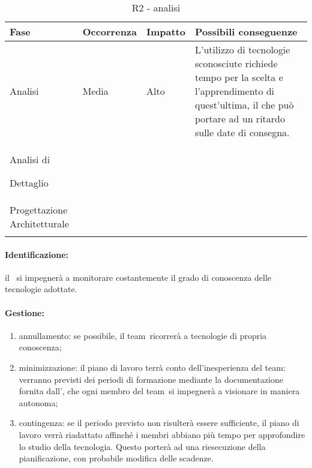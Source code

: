 \documentclass[../PianoProgetto.tex]{subfiles}
\begin{document}
	\begin{table}[h]
		\centering
		\begin{tabularx}{\textwidth}{F O O P}
			\toprule
			\textbf{Fase} & \textbf{Occorrenza} & \textbf{Impatto} & \textbf{Possibili conseguenze}\\
			\midrule
			Analisi & Media & Alto & L'utilizzo di tecnologie sconosciute richiede tempo per la scelta e l'apprendimento di quest'ultima, il che può portare ad un ritardo sulle date di consegna. \\
			\midrule
			Analisi di \par Dettaglio & & & \\
			\midrule
			Progettazione Architetturale & & & \\
			\bottomrule
		\end{tabularx}
		\caption{R2 - analisi}
		\label{tab:R2-analisi}	
	\end{table} 
	
	\paragraph*{Identificazione:} il \responsabilediprogetto\ si impegnerà a monitorare costantemente il grado di conoscenza delle tecnologie adottate.	
	
	\paragraph*{Gestione:}
	\begin{enumerate}
		\item annullamento: se possibile, il team\g\ ricorrerà a tecnologie di propria conoscenza;
		\item minimizzazione: il piano di lavoro terrà conto dell'inesperienza del team\g : verranno previsti dei periodi di formazione mediante la documentazione fornita dall'\amministratore , che ogni membro del team\g\ si impegnerà a visionare in maniera autonoma;
		\item contingenza: se il periodo previsto non risulterà essere sufficiente, il piano di lavoro verrà riadattato affinché i membri abbiano più tempo per approfondire lo studio della tecnologia. Questo porterà ad una riesecuzione della pianificazione, con probabile modifica delle scadenze.
	\end{enumerate}
	
\end{document}
